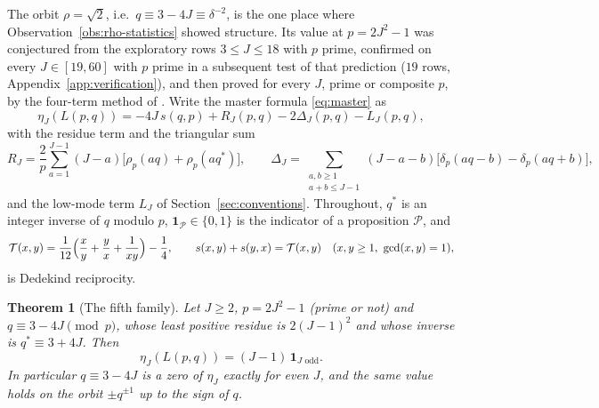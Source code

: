 \documentclass[11pt]{article}
\newtheorem{theorem}{Theorem}[section]
\theoremstyle{definition}
\newcommand{\ind}{\mathbf 1}
\begin{document}
The orbit $\rho=\sqrt2$, i.e.\ $q\equiv3-4J\equiv\delta^{-2}$, is the
one place where Observation~\ref{obs:rho-statistics} showed structure.
Its value at $p=2J^2-1$ was conjectured from the exploratory rows
$3\leq J\leq18$ with $p$ prime, confirmed on every $J\in[19,60]$ with
$p$ prime in a subsequent test of that prediction ($19$ rows,
Appendix~\ref{app:verification}), and then proved for every $J$, prime
or composite $p$, by the four-term method of
\cite[Thm.~7.1]{MahmoodP1Collection2026}.  Write the master formula
\eqref{eq:master} as
\begin{equation}
 \eta_J(L(p,q))=-4J\,s(q,p)+R_J(p,q)-2\Delta_J(p,q)-L_J(p,q),
 \label{eq:master-four-terms}
\end{equation}
with the residue term and the triangular sum
\[
 R_J=\frac2p\sum_{a=1}^{J-1}(J-a)\bigl[\rho_p(aq)+\rho_p(aq^*)\bigr],\qquad
 \Delta_J=\!\!\sum_{\substack{a,b\geq1\\a+b\leq J-1}}\!\!(J-a-b)
 \bigl[\delta_p(aq-b)-\delta_p(aq+b)\bigr],
\]
and the low-mode term $L_J$ of Section~\ref{sec:conventions}.
Throughout, $q^*$ is an integer inverse of $q$ modulo $p$,
$\ind_{\mathcal P}\in\{0,1\}$ is the indicator of a proposition
$\mathcal P$, and
\begin{equation}
 \mathcal T(x,y)=\frac1{12}\Bigl(\frac xy+\frac yx+\frac1{xy}\Bigr)-\frac14,
 \qquad s(x,y)+s(y,x)=\mathcal T(x,y)\quad(x,y\geq1,\ \gcd(x,y)=1),
 \label{eq:reciprocity}
\end{equation}
is Dedekind reciprocity.

\begin{theorem}[The fifth family]
\label{thm:C4}
Let $J\geq2$, $p=2J^2-1$ (prime or not) and $q\equiv3-4J\pmod p$, whose
least positive residue is $2(J-1)^2$ and whose inverse is
$q^*\equiv3+4J$.  Then
\begin{equation}
 \eta_J(L(p,q))=(J-1)\,\ind_{J\text{ odd}} .
 \label{eq:C4}
\end{equation}
In particular $q\equiv3-4J$ is a zero of $\eta_J$ exactly for even $J$,
and the same value holds on the orbit $\pm q^{\pm1}$ up to the sign of
$q$.
\end{theorem}
\end{document}
